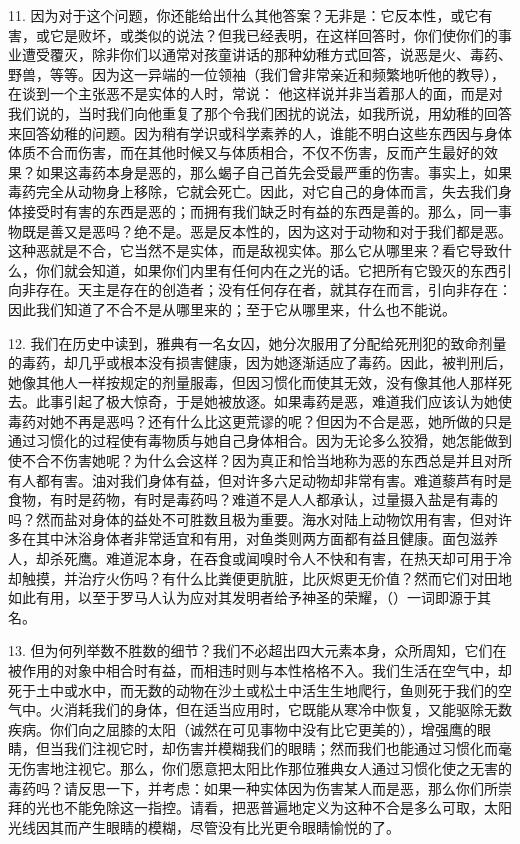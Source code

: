 11. 因为对于这个问题，你还能给出什么其他答案？无非是：它反本性，或它有害，或它是败坏，或类似的说法？但我已经表明，在这样回答时，你们使你们的事业遭受覆灭，除非你们以通常对孩童讲话的那种幼稚方式回答，说恶是火、毒药、野兽，等等。因为这一异端的一位领袖（我们曾非常亲近和频繁地听他的教导），在谈到一个主张恶不是实体的人时，常说： 他这样说并非当着那人的面，而是对我们说的，当时我们向他重复了那个令我们困扰的说法，如我所说，用幼稚的回答来回答幼稚的问题。因为稍有学识或科学素养的人，谁能不明白这些东西因与身体体质不合而伤害，而在其他时候又与体质相合，不仅不伤害，反而产生最好的效果？如果这毒药本身是恶的，那么蝎子自己首先会受最严重的伤害。事实上，如果毒药完全从动物身上移除，它就会死亡。因此，对它自己的身体而言，失去我们身体接受时有害的东西是恶的；而拥有我们缺乏时有益的东西是善的。那么，同一事物既是善又是恶吗？绝不是。恶是反本性的，因为这对于动物和对于我们都是恶。这种恶就是不合，它当然不是实体，而是敌视实体。那么它从哪里来？看它导致什么，你们就会知道，如果你们内里有任何内在之光的话。它把所有它毁灭的东西引向非存在。天主是存在的创造者；没有任何存在者，就其存在而言，引向非存在：因此我们知道了不合不是从哪里来的；至于它从哪里来，什么也不能说。\par

12. 我们在历史中读到，雅典有一名女囚，她分次服用了分配给死刑犯的致命剂量的毒药，却几乎或根本没有损害健康，因为她逐渐适应了毒药。因此，被判刑后，她像其他人一样按规定的剂量服毒，但因习惯化而使其无效，没有像其他人那样死去。此事引起了极大惊奇，于是她被放逐。如果毒药是恶，难道我们应该认为她使毒药对她不再是恶吗？还有什么比这更荒谬的呢？但因为不合是恶，她所做的只是通过习惯化的过程使有毒物质与她自己身体相合。因为无论多么狡猾，她怎能做到使不合不伤害她呢？为什么会这样？因为真正和恰当地称为恶的东西总是并且对所有人都有害。油对我们身体有益，但对许多六足动物却非常有害。难道藜芦有时是食物，有时是药物，有时是毒药吗？难道不是人人都承认，过量摄入盐是有毒的吗？然而盐对身体的益处不可胜数且极为重要。海水对陆上动物饮用有害，但对许多在其中沐浴身体者非常适宜和有用，对鱼类则两方面都有益且健康。面包滋养人，却杀死鹰。难道泥本身，在吞食或闻嗅时令人不快和有害，在热天却可用于冷却触摸，并治疗火伤吗？有什么比粪便更肮脏，比灰烬更无价值？然而它们对田地如此有用，以至于罗马人认为应对其发明者给予神圣的荣耀，（）一词即源于其名。\par

13. 但为何列举数不胜数的细节？我们不必超出四大元素本身，众所周知，它们在被作用的对象中相合时有益，而相违时则与本性格格不入。我们生活在空气中，却死于土中或水中，而无数的动物在沙土或松土中活生生地爬行，鱼则死于我们的空气中。火消耗我们的身体，但在适当应用时，它既能从寒冷中恢复，又能驱除无数疾病。你们向之屈膝的太阳（诚然在可见事物中没有比它更美的），增强鹰的眼睛，但当我们注视它时，却伤害并模糊我们的眼睛；然而我们也能通过习惯化而毫无伤害地注视它。那么，你们愿意把太阳比作那位雅典女人通过习惯化使之无害的毒药吗？请反思一下，并考虑：如果一种实体因为伤害某人而是恶，那么你们所崇拜的光也不能免除这一指控。请看，把恶普遍地定义为这种不合是多么可取，太阳光线因其而产生眼睛的模糊，尽管没有比光更令眼睛愉悦的了。\par

